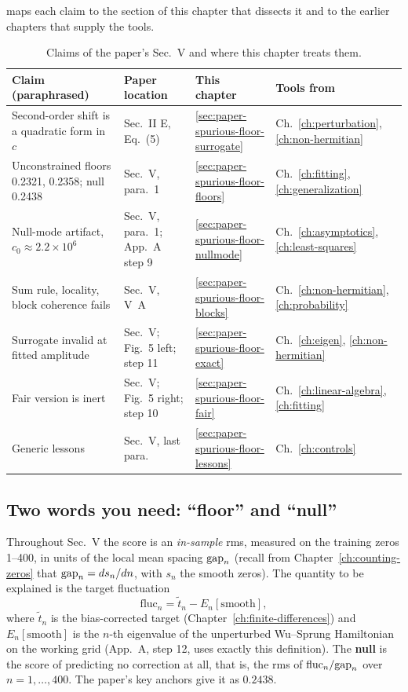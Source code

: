  maps each claim to the section of this chapter that dissects it and to the earlier chapters that supply the tools.

\begin{table}[htbp]\centering
\caption{Claims of the paper's Sec.~V and where this chapter treats them.}\label{tab:paper-spurious-floor-map}
\small
\begin{tabular}{p{5.2cm}p{2.6cm}p{2.4cm}p{2.6cm}}
\toprule
Claim (paraphrased) & Paper location & This chapter & Tools from \\
\midrule
Second-order shift is a quadratic form in $c$ & Sec.~II E, Eq.~(5) & \cref{sec:paper-spurious-floor-surrogate} & Ch.~\ref{ch:perturbation}, \ref{ch:non-hermitian} \\
Unconstrained floors 0.2321, 0.2358; null 0.2438 & Sec.~V, para.~1 & \cref{sec:paper-spurious-floor-floors} & Ch.~\ref{ch:fitting}, \ref{ch:generalization} \\
Null-mode artifact, $c_0\approx2.2\times10^6$ & Sec.~V, para.~1; App.~A step 9 & \cref{sec:paper-spurious-floor-nullmode} & Ch.~\ref{ch:asymptotics}, \ref{ch:least-squares} \\
Sum rule, locality, block coherence fails & Sec.~V, V~A & \cref{sec:paper-spurious-floor-blocks} & Ch.~\ref{ch:non-hermitian}, \ref{ch:probability} \\
Surrogate invalid at fitted amplitude & Sec.~V; Fig.~5 left; step 11 & \cref{sec:paper-spurious-floor-exact} & Ch.~\ref{ch:eigen}, \ref{ch:non-hermitian} \\
Fair version is inert & Sec.~V; Fig.~5 right; step 10 & \cref{sec:paper-spurious-floor-fair} & Ch.~\ref{ch:linear-algebra}, \ref{ch:fitting} \\
Generic lessons & Sec.~V, last para. & \cref{sec:paper-spurious-floor-lessons} & Ch.~\ref{ch:controls} \\
\bottomrule
\end{tabular}
\end{table}

\subsection{Two words you need: ``floor'' and ``null''}

Throughout Sec.~V the score is an \emph{in-sample} rms, measured on the training zeros 1--400, in units of the local mean spacing $\mathrm{gap}_n$ (recall from Chapter~\ref{ch:counting-zeros} that $\mathrm{gap}_n=ds_n/dn$, with $s_n$ the smooth zeros). The quantity to be explained is the target fluctuation
\begin{equation}
\mathrm{fluc}_n=\tilde t_n-E_n[\mathrm{smooth}],\label{eq:paper-spurious-floor-fluc}
\end{equation}
where $\tilde t_n$ is the bias-corrected target (Chapter~\ref{ch:finite-differences}) and $E_n[\mathrm{smooth}]$ is the $n$-th eigenvalue of the unperturbed Wu--Sprung Hamiltonian on the working grid (App.~A, step 12, uses exactly this definition). The \textbf{null} is the score of predicting no correction at all, that is, the rms of $\mathrm{fluc}_n/\mathrm{gap}_n$ over $n=1,\dots,400$. The paper's key anchors give it as $0.2438$.

